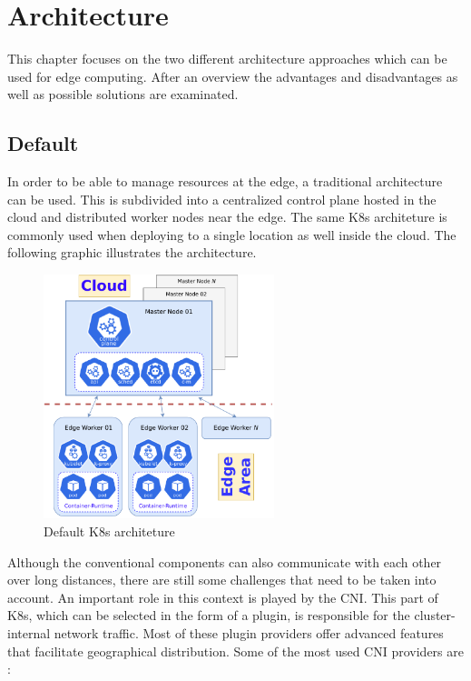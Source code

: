 \documentclass[MSC,Master,english]{twbook}%
\begin{document}
\section{Architecture}
\label{sec:architecture}
This chapter focuses on the two different architecture approaches which can be used for edge computing. After an overview the advantages and disadvantages as well as possible solutions are examinated.

\subsection{Default}
\label{sec:arch-default}
In order to be able to manage resources at the edge, a traditional architecture can be used. This is subdivided into a centralized control plane hosted in the cloud and distributed worker nodes near the edge. The same \ac{K8s} architeture is commonly used when deploying to a single location as well inside the cloud. The following graphic illustrates the architecture.

\begin{figure}[ht]
    \centering
    \includegraphics[width=0.60\textwidth]{PICs/drawio/defaul-k8s.drawio.pdf}
    \caption{Default \ac{K8s} architeture}
    \label{fig:k8s-default}
\end{figure}

Although the conventional components can also communicate with each other over long distances, there are still some challenges that need to be taken into account. An important role in this context is played by the \ac{CNI}. This part of \ac{K8s}, which can be selected in the form of a plugin, is responsible for the cluster-internal network traffic. Most of these plugin providers offer advanced features that facilitate geographical distribution. Some of the most used \ac{CNI} providers are \cite{k8s-cni}:
\end{document}
